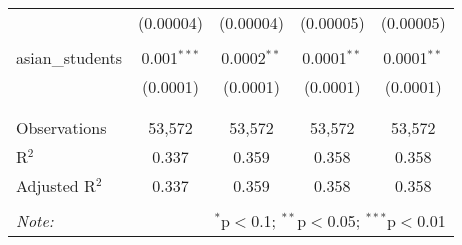 \begin{table}[!htbp]
\begin{tabular}{@{\extracolsep{-2pt}}lcccc}
  & (0.00004) & (0.00004) & (0.00005) & (0.00005) \\ 
  & & & & \\ 
 asian\_students & 0.001$^{***}$ & 0.0002$^{**}$ & 0.0001$^{**}$ & 0.0001$^{**}$ \\ 
  & (0.0001) & (0.0001) & (0.0001) & (0.0001) \\ 
  & & & & \\ 
\hline \\[-1.8ex] 
Observations & 53,572 & 53,572 & 53,572 & 53,572 \\ 
R$^{2}$ & 0.337 & 0.359 & 0.358 & 0.358 \\ 
Adjusted R$^{2}$ & 0.337 & 0.359 & 0.358 & 0.358 \\ 
\hline 
\hline \\[-1.8ex] 
\textit{Note:}  & \multicolumn{4}{r}{$^{*}$p$<$0.1; $^{**}$p$<$0.05; $^{***}$p$<$0.01} \\ 
\end{tabular} 
\end{table} 
